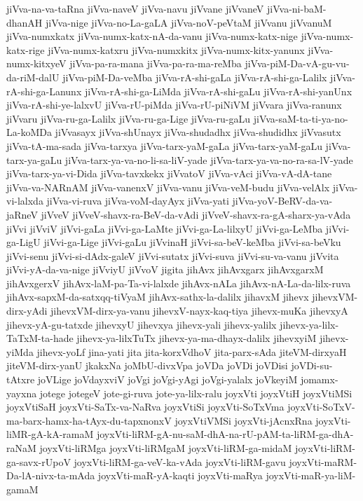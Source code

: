 {jiVva-na-va-taRna
jiVva-naveV
jiVva-navu
jiVvane
jiVvaneV
jiVva-ni-baM-dhanAH
jiVva-nige
jiVva-no-La-gaLA
jiVva-noV-peVtaM
jiVvanu
jiVvanuM
jiVva-numxkatx
jiVva-numx-katx-nA-da-vanu
jiVva-numx-katx-nige
jiVva-numx-katx-rige
jiVva-numx-katxru
jiVva-numxkitx
jiVva-numx-kitx-yanunx
jiVva-numx-kitxyeV
jiVva-pa-ra-mana
jiVva-pa-ra-ma-reMba
jiVva-piM-Da-vA-gu-vu-da-riM-dalU
jiVva-piM-Da-veMba
jiVva-rA-shi-gaLa
jiVva-rA-shi-ga-Lalilx
jiVva-rA-shi-ga-Lanunx
jiVva-rA-shi-ga-LiMda
jiVva-rA-shi-gaLu
jiVva-rA-shi-yanUnx
jiVva-rA-shi-ye-lalxvU
jiVva-rU-piMda
jiVva-rU-piNiVM
jiVvara
jiVva-ranunx
jiVvaru
jiVva-ru-ga-Lalilx
jiVva-ru-ga-Lige
jiVva-ru-gaLu
jiVva-saM-ta-ti-ya-no-La-koMDa
jiVvasayx
jiVva-shUnayx
jiVva-shudadhx
jiVva-shudidhx
jiVvasutx
jiVva-tA-ma-sada
jiVva-tarxya
jiVva-tarx-yaM-gaLa
jiVva-tarx-yaM-gaLu
jiVva-tarx-ya-gaLu
jiVva-tarx-ya-va-no-li-sa-liV-yade
jiVva-tarx-ya-va-no-ra-sa-lV-yade
jiVva-tarx-ya-vi-Dida
jiVva-tavxkekx
jiVvatoV
jiVva-vAci
jiVva-vA-dA-tane
jiVva-va-NARnAM
jiVva-vanenxV
jiVva-vanu
jiVva-veM-budu
jiVva-velAlx
jiVva-vi-lalxda
jiVva-vi-ruva
jiVva-voM-dayAyx
jiVva-yati
jiVva-yoV-BeRV-da-va-jaRneV
jiVveV
jiVveV-shavx-ra-BeV-da-vAdi
jiVveV-shavx-ra-gA-sharx-ya-vAda
jiVvi
jiVviV
jiVvi-gaLa
jiVvi-ga-LaMte
jiVvi-ga-La-lilxyU
jiVvi-ga-LeMba
jiVvi-ga-LigU
jiVvi-ga-Lige
jiVvi-gaLu
jiVvinaH
jiVvi-sa-beV-keMba
jiVvi-sa-beVku
jiVvi-senu
jiVvi-si-dAdx-galeV
jiVvi-sutatx
jiVvi-suva
jiVvi-su-va-vanu
jiVvita
jiVvi-yA-da-va-nige
jiVviyU
jiVvoV
jigita
jihAvx
jihAvxgarx
jihAvxgarxM
jihAvxgerxV
jihAvx-laM-pa-Ta-vi-lalxde
jihAvx-nALa
jihAvx-nA-La-da-lilx-ruva
jihAvx-sapxM-da-satxqq-tiVyaM
jihAvx-sathx-la-dalilx
jihavxM
jihevx
jihevxVM-dirx-yAdi
jihevxVM-dirx-ya-vanu
jihevxV-nayx-kaq-tiya
jihevx-muKa
jihevxyA
jihevx-yA-gu-tatxde
jihevxyU
jihevxya
jihevx-yali
jihevx-yalilx
jihevx-ya-lilx-TaTxM-ta-hade
jihevx-ya-lilxTuTx
jihevx-ya-ma-dhayx-dalilx
jihevxyiM
jihevx-yiMda
jihevx-yoLf
jina-yati
jita
jita-korxVdhoV
jita-parx-sAda
jiteVM-dirxyaH
jiteVM-dirx-yanU
jkakxNa
joMbU-divxVpa
joVDa
joVDi
joVDisi
joVDi-su-tAtxre
joVLige
joVdayxviV
joVgi
joVgi-yAgi
joVgi-yalalx
joVkeyiM
jomamx-yayxna
jotege
jotegeV
jote-gi-ruva
jote-ya-lilx-ralu
joyxVti
joyxVtiH
joyxVtiMSi
joyxVtiSaH
joyxVti-SaTx-va-NaRva
joyxVtiSi
joyxVti-SoTxVma
joyxVti-SoTxV-ma-barx-hamx-ha-tAyx-du-tapxnonxV
joyxVtiVMSi
joyxVti-jAcnxRna
joyxVti-liMR-gA-kA-ramaM
joyxVti-liRM-gA-nu-saM-dhA-na-rU-pAM-ta-liRM-ga-dhA-raNaM
joyxVti-liRMga
joyxVti-liRMgaM
joyxVti-liRM-ga-midaM
joyxVti-liRM-ga-savx-rUpoV
joyxVti-liRM-ga-veV-ka-vAda
joyxVti-liRM-gavu
joyxVti-maRM-Da-lA-nivx-ta-mAda
joyxVti-maR-yA-kaqti
joyxVti-maRya
joyxVti-maR-ya-liM-gamaM
}
